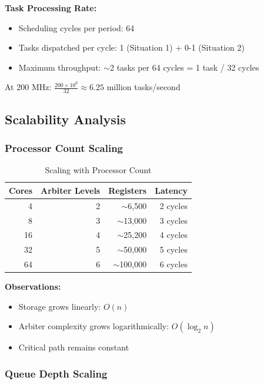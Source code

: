 \documentclass[12pt,a4paper]{article}
\begin{document}
\textbf{Task Processing Rate:}
\begin{itemize}
    \item Scheduling cycles per period: 64
    \item Tasks dispatched per cycle: 1 (Situation 1) + 0-1 (Situation 2)
    \item Maximum throughput: $\sim$2 tasks per 64 cycles = 1 task / 32 cycles
\end{itemize}

At 200 MHz: $\frac{200 \times 10^6}{32} \approx 6.25$ million tasks/second

\subsection{Scalability Analysis}

\subsubsection{Processor Count Scaling}

\begin{table}[H]
\centering
\begin{tabular}{|r|r|r|r|}
\hline
\textbf{Cores} & \textbf{Arbiter Levels} & \textbf{Registers} & \textbf{Latency} \\
\hline
4 & 2 & $\sim$6,500 & 2 cycles \\
8 & 3 & $\sim$13,000 & 3 cycles \\
16 & 4 & $\sim$25,200 & 4 cycles \\
32 & 5 & $\sim$50,000 & 5 cycles \\
64 & 6 & $\sim$100,000 & 6 cycles \\
\hline
\end{tabular}
\caption{Scaling with Processor Count}
\end{table}

\textbf{Observations:}
\begin{itemize}
    \item Storage grows linearly: $O(n)$
    \item Arbiter complexity grows logarithmically: $O(\log_2 n)$
    \item Critical path remains constant
\end{itemize}

\subsubsection{Queue Depth Scaling}
\end{document}
